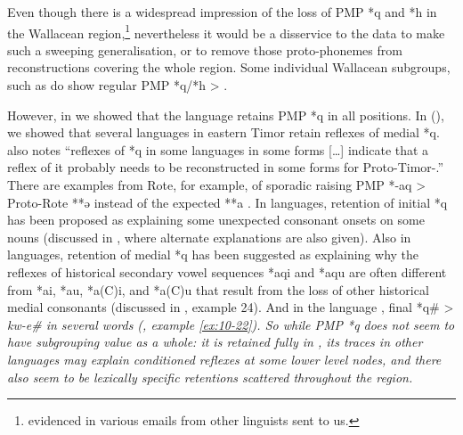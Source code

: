 Even though there is a widespread impression of the loss of PMP
*q and *h in the Wallacean region,\footnote{
		 evidenced in various
		emails from other linguists sent to us.}
nevertheless it would
be a disservice to the data to make such a sweeping generalisation,
or to remove those proto-phonemes from reconstructions covering the whole region.
Some individual Wallacean subgroups,
such as  do show regular PMP *q/*h > {\0}.

However, in  we showed that the 
language  retains PMP *q in all positions.
In  (), we showed that several  languages
in eastern Timor retain reflexes of medial *q.
\citet[82]{Edwards2021} also notes “reflexes of *q in some languages
in some forms [{\ldots}] indicate that a reflex of it probably
needs to be reconstructed in some forms for Proto-Timor-.”
There are examples from Rote,
for example, of sporadic raising PMP *-aq > Proto-Rote **ə instead
of the expected **a \citep[151]{Edwards2021}.
In  languages, retention of initial *q has been
proposed \citep[121ff]{Collins1983} as explaining some unexpected
consonant onsets on some nouns (discussed in ,
where alternate explanations are also given).
Also in  languages,
retention of medial *q has been suggested as explaining why the
reflexes of historical secondary vowel sequences *aqi
and *aqu are often different from *ai,
*au, *a(C)i, and *a(C)u that result from the loss of other historical
medial consonants (discussed in , example 24).
And in the  language ,
final *q{\#} > \it{kw-e{\#}} in several words (, example \ref{ex:10-22}).
So while PMP *q does not seem to have subgrouping value as a
whole: it is retained fully in ,
its traces in other languages may explain conditioned reflexes
at some lower level nodes,
and there also seem to be lexically specific retentions scattered throughout the region.

